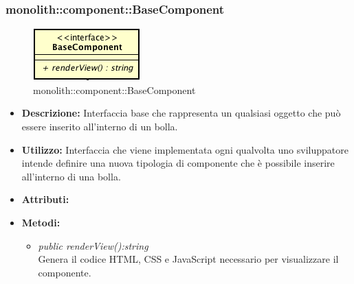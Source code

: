 \subsubsection{monolith::component::BaseComponent}

\label{monolith::component::BaseComponent}
\begin{figure}[ht]
	\centering
	\includegraphics[scale=0.5]{Sezioni/SottosezioniST/img/BaseComponent.png}
	\caption{monolith::component::BaseComponent}
\end{figure}

\begin{itemize}
\item \textbf{Descrizione:} Interfaccia base che rappresenta un qualsiasi oggetto che può essere inserito all'interno di un bolla.
\item \textbf{Utilizzo:} Interfaccia che viene implementata ogni qualvolta uno sviluppatore intende definire una nuova tipologia di componente che è possibile inserire all'interno di una bolla.
\item \textbf{Attributi:}
\item \textbf{Metodi:}
\begin{itemize}
\item \textit{public renderView():string}\\
Genera il codice HTML, CSS e JavaScript necessario per visualizzare il componente.
\end{itemize}
\end{itemize}